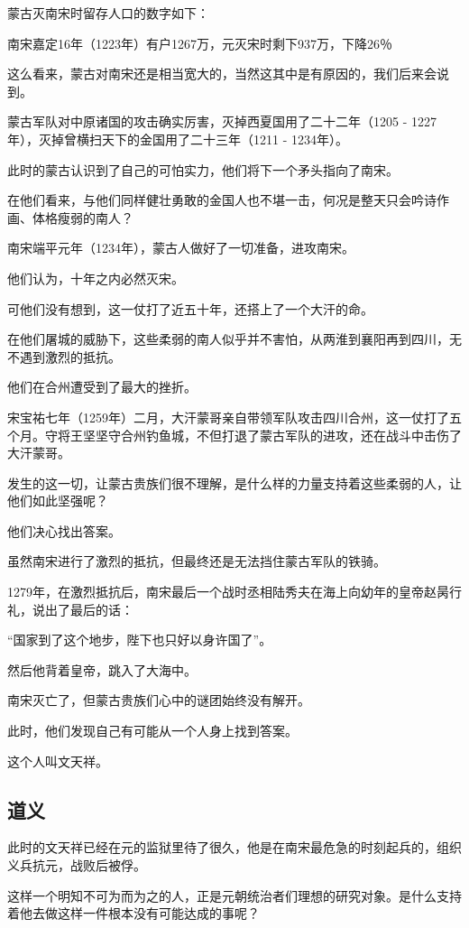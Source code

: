 \begin{multicols}{\theparacolNo}
		蒙古灭南宋时留存人口的数字如下：

		南宋嘉定16年（1223年）有户1267万，元灭宋时剩下937万，下降26％

		这么看来，蒙古对南宋还是相当宽大的，当然这其中是有原因的，我们后来会说到。

		蒙古军队对中原诸国的攻击确实厉害，灭掉西夏国用了二十二年（1205 - 1227年），灭掉曾横扫天下的金国用了二十三年（1211 - 1234年）。

		此时的蒙古认识到了自己的可怕实力，他们将下一个矛头指向了南宋。

		在他们看来，与他们同样健壮勇敢的金国人也不堪一击，何况是整天只会吟诗作画、体格瘦弱的南人？

		南宋端平元年（1234年），蒙古人做好了一切准备，进攻南宋。

		他们认为，十年之内必然灭宋。

		可他们没有想到，这一仗打了近五十年，还搭上了一个大汗的命。

		在他们屠城的威胁下，这些柔弱的南人似乎并不害怕，从两淮到襄阳再到四川，无不遇到激烈的抵抗。

		他们在合州遭受到了最大的挫折。

		宋宝祐七年（1259年）二月，大汗蒙哥亲自带领军队攻击四川合州，这一仗打了五个月。守将王坚坚守合州钓鱼城，不但打退了蒙古军队的进攻，还在战斗中击伤了大汗蒙哥。

		发生的这一切，让蒙古贵族们很不理解，是什么样的力量支持着这些柔弱的人，让他们如此坚强呢？

		他们决心找出答案。

		虽然南宋进行了激烈的抵抗，但最终还是无法挡住蒙古军队的铁骑。

		1279年，在激烈抵抗后，南宋最后一个战时丞相陆秀夫在海上向幼年的皇帝赵昺行礼，说出了最后的话：

		“国家到了这个地步，陛下也只好以身许国了”。

		然后他背着皇帝，跳入了大海中。

		南宋灭亡了，但蒙古贵族们心中的谜团始终没有解开。

		此时，他们发现自己有可能从一个人身上找到答案。

		这个人叫文天祥。

		\subsection{道义}
		此时的文天祥已经在元的监狱里待了很久，他是在南宋最危急的时刻起兵的，组织义兵抗元，战败后被俘。

		这样一个明知不可为而为之的人，正是元朝统治者们理想的研究对象。是什么支持着他去做这样一件根本没有可能达成的事呢？


\end{multicols}

